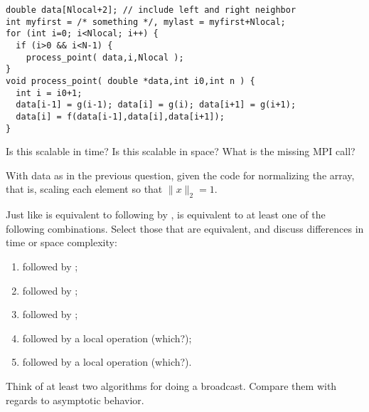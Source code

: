 \begin{review}
\begin{lstlisting}
double data[Nlocal+2]; // include left and right neighbor
int myfirst = /* something */, mylast = myfirst+Nlocal;
for (int i=0; i<Nlocal; i++) {
  if (i>0 && i<N-1) {
    process_point( data,i,Nlocal );
}
void process_point( double *data,int i0,int n ) {
  int i = i0+1;    
  data[i-1] = g(i-1); data[i] = g(i); data[i+1] = g(i+1);
  data[i] = f(data[i-1],data[i],data[i+1]); 
}
\end{lstlisting}
Is this scalable in time? Is this scalable in space?
What is the missing MPI call?
\end{review}

\begin{review}
  With data as in the previous question, given the code for
  normalizing the array, that is, scaling each element so that $\|x\|_2=1$.
\end{review}

\begin{review}
  Just like  is equivalent to
   following by ,
   is equivalent to at least
  one of the following combinations. Select those that are equivalent,
  and discuss differences in time or space complexity:
  \begin{enumerate}
  \item {} followed by ;
  \item {} followed by ;
  \item {} followed by ;
  \item {} followed by a local operation (which?);
  \item {} followed by a local operation (which?).
  \end{enumerate}
\end{review}

\begin{review}
  Think of at least two algorithms for doing a broadcast.
  Compare them with regards to asymptotic behavior.
\end{review}

